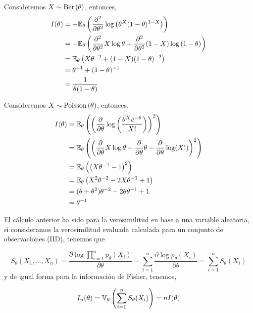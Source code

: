 \begin{exercise}
	Consideremos $X\sim\text{Ber}\left(\theta\right)$, entonces, 
	\begin{align}
		I(\theta) &= -\mathbb{E}_\theta \left(\frac{\partial^2}{\partial\theta^2}\log\left(\theta^X(1-\theta)^{1-X}\right)\right)\nonumber\\
		&= -\mathbb{E}_\theta \left(\frac{\partial^2}{\partial\theta^2} X\log\theta + \frac{\partial^2}{\partial\theta^2} 	(1-X)\log\left(1-\theta\right)	\right)\nonumber\\
		&= \mathbb{E}_\theta \left(X\theta^{-2} + (1-X)(1-\theta)^{-2}	\right)\nonumber\\
		&= \theta^{-1} + (1-\theta)^{-1}	\nonumber\\
		&= 	\frac{1}{\theta(1-\theta)}	
	\end{align}
\end{exercise}

\begin{exercise}
	Consideremos $X\sim\text{Poisson}\left(\theta\right)$, entonces, 
	\begin{align}
		I(\theta) &= \mathbb{E}_\theta \left(\left(\frac{\partial}{\partial\theta}\log\left(\frac{\theta^Xe^{-\theta}}{X!}\right)\right)^2\right)\nonumber	\\
		&= \mathbb{E}_\theta \left(\left( \frac{\partial}{\partial\theta}X\log\theta - \frac{\partial}{\partial\theta}\theta - \frac{\partial}{\partial\theta}\log(X!)\right)^2\right)\nonumber\\
		&= \mathbb{E}_\theta \left(\left( X\theta^{-1} - 1\right)^2\right)\nonumber	\\
		&= \mathbb{E}_\theta \left( X^2\theta^{-2} -2X\theta^{-1}+ 1\right)\nonumber	\\
		&= (\theta+\theta^2)\theta^{-2} -2\theta\theta^{-1}+ 1\nonumber\\
		&= \theta^{-1}\nonumber	
	\end{align}
\end{exercise}

El cálculo anterior ha sido para la verosimilitud en base a una variable aleatoria, si consideramos la verosimilitud evaluada calculada para un conjunto de observaciones (IID), tenemos que

\begin{equation}
	S_\theta(X_1,\ldots,X_n) = \frac{\partial \log \prod_{i=1}^np_\theta(X_i)}{\partial\theta} = \sum_{i=1}^n\frac{\partial \log p_\theta(X_i)}{\partial\theta}= \sum_{i=1}^n S_\theta(X_i)
\end{equation}
y de igual forma para la información de Fisher, tenemos, 

\begin{equation}
	I_n(\theta) = \mathbb{V}_\theta \left(\sum_{i=1}^n S_\theta(X_i)\right) = n I(\theta)
\end{equation}

